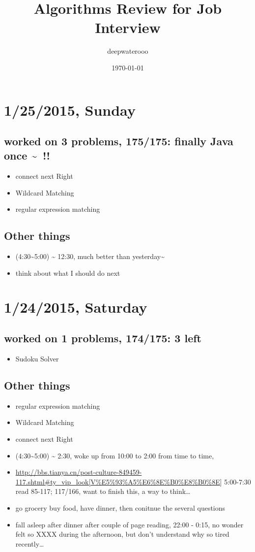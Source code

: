 \documentclass[9pt,b5paper]{article}
\author{deepwaterooo}
\date{\today}
\title{Algorithms Review for Job Interview}
\begin{document}
\maketitle
\tableofcontents


\section{1/25/2015, Sunday}
\label{sec-1}
\subsection{worked on 3 problems, 175/175: finally Java once \textasciitilde{}~!!}
\label{sec-1-1}
\begin{itemize}
\item connect next Right
\item Wildcard Matching
\item regular expression matching
\end{itemize}
\subsection{Other things}
\label{sec-1-2}
\begin{itemize}
\item (4:30\textasciitilde{}5:00) \textasciitilde{} 12:30, much better than yesterday\textasciitilde{}~
\item think about what I should do next
\end{itemize}
\section{1/24/2015, Saturday}
\label{sec-2}
\subsection{worked on 1 problems, 174/175: 3 left}
\label{sec-2-1}
\begin{itemize}
\item Sudoku Solver
\end{itemize}
\subsection{Other things}
\label{sec-2-2}
\begin{itemize}
\item regular expression matching
\item Wildcard Matching
\item connect next Right
\item (4:30\textasciitilde{}5:00) \textasciitilde{} 2:30, woke up from 10:00 to 2:00 from time to time,
\item \url{http://bbs.tianya.cn/post-culture-849459-117.shtml#ty_vip_look[V\%E5\%93\%A5\%E6\%8E\%B0\%E8\%B0\%8E}] 5:00-7:30 read 85-117; 117/166, want to finish this, a way to think\ldots{}
\item go grocery buy food, have dinner, then conitnue the several questions
\item fall asleep after dinner after couple of page reading, 22:00 - 0:15, no wonder felt so XXXX during the afternoon, but don't understand why so tired recently\ldots{}
\end{itemize}
\end{document}
